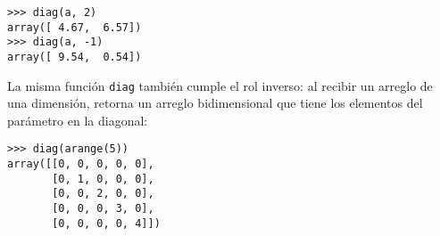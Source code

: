 \begin{lstlisting}
>>> diag(a, 2)
array([ 4.67,  6.57])
>>> diag(a, -1)
array([ 9.54,  0.54])
\end{lstlisting}

La misma función \lstinline!diag! también cumple el rol inverso: al
recibir un arreglo de una dimensión, retorna un arreglo bidimensional
que tiene los elementos del parámetro en la diagonal:

\begin{lstlisting}
>>> diag(arange(5))
array([[0, 0, 0, 0, 0],
       [0, 1, 0, 0, 0],
       [0, 0, 2, 0, 0],
       [0, 0, 0, 3, 0],
       [0, 0, 0, 0, 4]])
\end{lstlisting}

